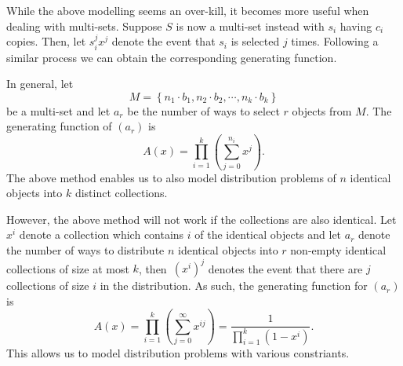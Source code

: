 \documentclass[math]{amznotes}
\theoremstyle{remark}
\begin{document}
While the above modelling seems an over-kill, it becomes more useful when dealing with multi-sets. Suppose $S$ is now a multi-set instead with $s_i$ having $c_i$ copies. Then, let $s_i^jx^j$ denote the event that $s_i$ is selected $j$ times. Following a similar process we can obtain the corresponding generating function.

In general, let 
\begin{equation*}
    M = \left\{n_1 \cdot b_1, n_2 \cdot b_2, \cdots, n_k \cdot b_k\right\}
\end{equation*}
be a multi-set and let $a_r$ be the number of ways to select $r$ objects from $M$. The generating function of $(a_r)$ is
\begin{equation*}
    A(x) = \prod_{i = 1}^{k}\left(\sum_{j = 0}^{n_i}x^j\right).
\end{equation*}
The above method enables us to also model distribution problems of $n$ identical objects into $k$ distinct collections. 

However, the above method will not work if the collections are also identical. Let $x^i$ denote a collection which contains $i$ of the identical objects and let $a_r$ denote the number of ways to distribute $n$ identical objects into $r$ non-empty identical collections of size at most $k$, then~$\left(x^i\right)^j$ denotes the event that there are $j$ collections of size $i$ in the distribution. As such, the generating function for $(a_r)$ is
\begin{equation*}
    A(x) = \prod_{i = 1}^{k}\left(\sum_{j = 0}^{\infty}x^{ij}\right) = \frac{1}{\prod_{i = 1}^{k}(1 - x^i)}.
\end{equation*}
This allows us to model distribution problems with various constriants.
\end{document}
